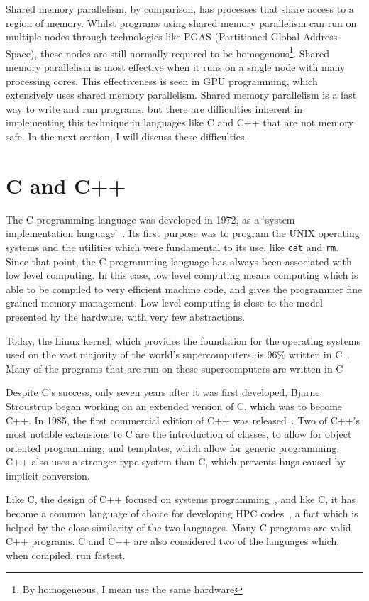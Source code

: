Shared memory parallelism, by comparison, has processes that share access to a region of memory. Whilst programs using shared memory parallelism can run on multiple nodes through technologies like PGAS (Partitioned Global Address Space), these nodes are still normally required to be homogenous\footnote{By homogeneous, I mean use the same hardware}. Shared memory parallelism is most effective when it runs on a single node with many processing cores. This effectiveness is seen in GPU programming, which extensively uses shared memory parallelism.
Shared memory parallelism is a fast way to write and run programs, but there are difficulties inherent in implementing this technique in languages like C and C++ that are not memory safe. In the next section, I will discuss these difficulties.

\section{C and C++}\label{sec:c}
The C programming language was developed in 1972, as a `system implementation language'~\cite{Ritchie:1993}. Its first purpose was to program the UNIX operating systems and the utilities which were fundamental to its use, like \texttt{cat} and \texttt{rm}. Since that point, the C programming language has always been associated with low level computing. In this case, low level computing means computing which is able to be compiled to very efficient machine code, and gives the programmer fine grained memory management. Low level computing is close to the model presented by the hardware, with very few abstractions.

Today, the Linux kernel, which provides the foundation for the operating systems used on the vast majority of the world's supercomputers, is 96\% written in C~\cite{LinuxKernel}. Many of the programs that are run on these supercomputers are written in C~\cite{fftw, ffs, foam}

Despite C's success, only seven years after it was first developed, Bjarne Stroustrup began working on an extended version of C, which was to become C++. In 1985, the first commercial edition of C++ was released~\cite{DandE}. Two of C++'s most notable extensions to C are the introduction of classes, to allow for object oriented programming, and templates, which allow for generic programming. C++ also uses a stronger type system than C, which prevents bugs caused by implicit conversion.

Like C, the design of C++ focused on systems programming~\cite{CplusEssence}, and like C, it has become a common language of choice for developing HPC codes~\cite{foam, tensorflow, lammps, gromacs}, a fact which is helped by the close similarity of the two languages. Many C programs are valid C++ programs. C and C++ are also considered two of the languages which, when compiled, run fastest.

